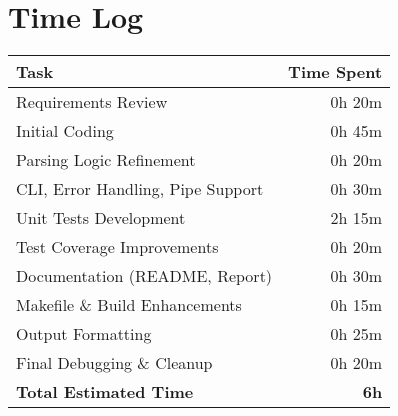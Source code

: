 \documentclass[10pt,a4paper]{article}
\begin{document}
\section*{Time Log}
\vspace{-0.5em}
\vspace{0.25em}
\centering
\begin{tabular}{@{}lr@{}}
	\toprule
	\textbf{Task}                     & \textbf{Time Spent} \\
	\midrule
	Requirements Review               & 0h 20m              \\
	Initial Coding                    & 0h 45m              \\
	Parsing Logic Refinement          & 0h 20m              \\
	CLI, Error Handling, Pipe Support & 0h 30m              \\
	Unit Tests Development            & 2h 15m              \\
	Test Coverage Improvements        & 0h 20m              \\
	Documentation (README, Report)    & 0h 30m              \\
	Makefile \& Build Enhancements    & 0h 15m              \\
	Output Formatting                 & 0h 25m              \\
	Final Debugging \& Cleanup        & 0h 20m              \\
	\midrule
	\textbf{Total Estimated Time}     & \textbf{6h}         \\
	\bottomrule
\end{tabular}
\end{document}
